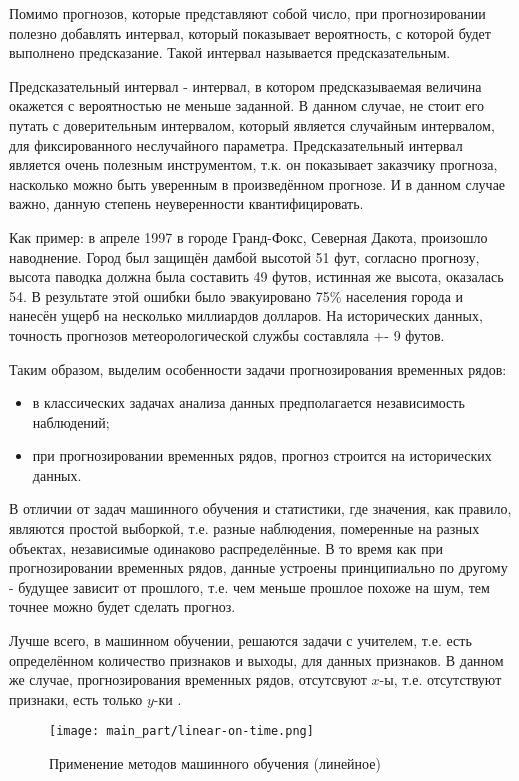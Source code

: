 Помимо прогнозов, которые представляют собой число, при прогнозировании полезно добавлять интервал, который показывает вероятность, с которой будет выполнено предсказание.
Такой интервал называется предсказательным. 

Предсказательный интервал - интервал, в котором предсказываемая величина окажется с вероятностью не меньше заданной. В данном случае, не стоит его путать с доверительным интервалом, который является случайным интервалом, для фиксированного неслучайного параметра. Предсказательный интервал является очень полезным инструментом, т.к. он показывает заказчику прогноза, насколько можно быть уверенным в произведённом прогнозе. И в данном случае важно, данную степень неуверенности квантифицировать.

Как пример: в апреле 1997 в городе Гранд-Фокс, Северная Дакота, произошло наводнение. Город был защищён дамбой высотой 51 фут, согласно прогнозу, высота паводка должна была составить 49 футов, истинная же высота, оказалась 54. В результате этой ошибки было эвакуировано 75\% населения города и нанесён ущерб на несколько миллиардов долларов. На исторических данных, точность прогнозов метеорологической службы составляла +- 9 футов.

Таким образом, выделим особенности задачи прогнозирования временных рядов:
\begin{itemize}
	\item в классических задачах анализа данных предполагается независимость наблюдений;
	\item при прогнозировании временных рядов, прогноз строится на исторических данных.
\end{itemize}

В отличии от задач машинного обучения и статистики, где значения, как правило, являются простой выборкой, т.е. разные наблюдения, померенные на разных объектах, независимые одинаково распределённые. В то время как при прогнозировании временных рядов, данные устроены принципиально по другому - будущее зависит от прошлого, т.е. чем меньше прошлое похоже на шум, тем точнее можно будет сделать прогноз.

Лучше всего, в машинном обучении, решаются задачи с учителем, т.е. есть определённом количество признаков и выходы, для данных признаков. В данном же случае, прогнозирования временных рядов, отсутсвуют $ x $-ы, т.е. отсутствуют признаки, есть только $y$-ки \cite{datamining_in_action}.

\begin{figure}[h]
\centering
	\texttt{[image: main\_part/linear-on-time.png]}
	\caption{Применение методов машинного обучения (линейное)}
	\label{sec:purpose:linear}
\end{figure}

